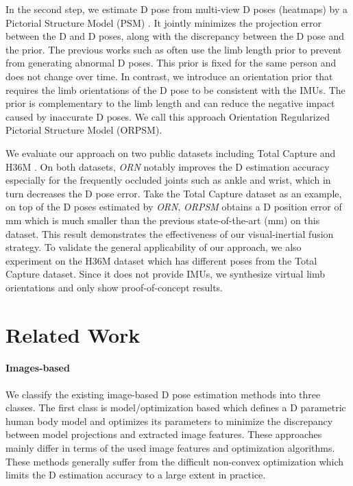 \documentclass[10pt,twocolumn,letterpaper]{article}
\begin{document}
In the second step, we estimate D pose from multi-view D poses (heatmaps) by a Pictorial Structure Model (PSM) \cite{kostrikov2014depth,PavlakosZDD17,belagiannis20143D}. It jointly minimizes the projection error between the D and D poses, along with the discrepancy between the D pose and the prior. The previous works such as \cite{PavlakosZDD17,qiu2019cross} often use the limb length prior to prevent from generating  abnormal D poses. This prior is fixed for the same person and does not change over time. In contrast, we introduce an orientation prior that requires the limb orientations of the D pose to be consistent with the IMUs. The prior is complementary to the limb length and can reduce the negative impact caused by inaccurate D poses. We call this approach Orientation Regularized Pictorial Structure Model (ORPSM).



We evaluate our approach on two public datasets including Total Capture \cite{trumble2017total} and H36M \cite{ionescu2014human3}. On both datasets, \emph{ORN} notably improves the D estimation accuracy especially for the frequently occluded joints such as ankle and wrist, which in turn decreases the D pose error. Take the Total Capture dataset as an example, on top of the D poses estimated by \emph{ORN}, \emph{ORPSM} obtains a D position error of mm which is much smaller than the previous state-of-the-art \cite{qiu2019cross} (mm) on this dataset. This result demonstrates the effectiveness of our visual-inertial fusion strategy. To validate the general applicability of our approach, we also experiment on the H36M dataset which has different poses from the Total Capture dataset. Since it does not provide IMUs, we synthesize virtual limb orientations and only show proof-of-concept results. 



\section{Related Work}
\paragraph{Images-based}

We classify the existing image-based D pose estimation methods into three classes. The first class is model/optimization based \cite{gall2010optimization,liu2011markerless} which defines a D parametric human body model and optimizes its parameters to minimize the discrepancy between model projections and extracted image features. These approaches mainly differ in terms of the used image features and optimization algorithms. These methods generally suffer from the difficult non-convex optimization which limits the D estimation accuracy to a large extent in practice.
\end{document}
